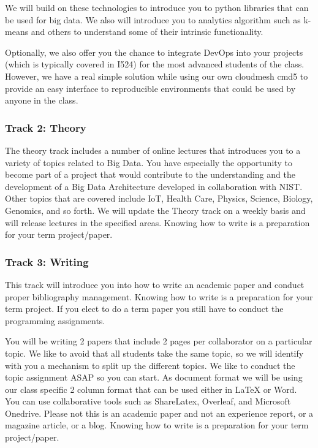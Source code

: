 We will build on these technologies to introduce you to python libraries
that can be used for big data. We also will introduce you to analytics
algorithm such as k-means and others to understand some of their
intrinsic functionality.

Optionally, we also offer you the chance to integrate DevOps into your
projects (which is typically covered in I524) for the most advanced
students of the class. However, we have a real simple solution while
using our own cloudmesh cmd5 to provide an easy interface to
reproducible environments that could be used by anyone in the class.

\subsubsection{Track 2: Theory}

The theory track includes a number of online lectures that introduces
you to a variety of topics related to Big Data. You have especially the
opportunity to become part of a project that would contribute to the
understanding and the development of a Big Data Architecture developed
in collaboration with NIST. Other topics that are covered include IoT,
Health Care, Physics, Science, Biology, Genomics, and so forth. We will
update the Theory track on a weekly basis and will release lectures in
the specified areas. Knowing how to write is a preparation for your term
project/paper.

\subsubsection{Track 3: Writing}

This track will introduce you into how to write an academic paper and
conduct proper bibliography management. Knowing how to write is a
preparation for your term project. If you elect to do a term paper you
still have to conduct the programming assignments.

You will be writing 2 papers that include 2 pages per collaborator on a
particular topic. We like to avoid that all students take the same
topic, so we will identify with you a mechanism to split up the
different topics. We like to conduct the topic assignment ASAP so you
can start. As document format we will be using our class specific 2
column format that can be used either in LaTeX or Word. You can use
collaborative tools such as ShareLatex, Overleaf, and Microsoft
Onedrive. Please not this is an academic paper and not an experience
report, or a magazine article, or a blog. Knowing how to write is a
preparation for your term project/paper.

